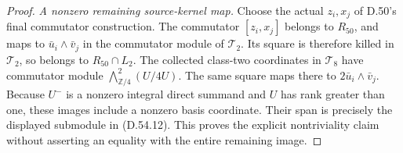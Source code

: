 \begin{proof}
\emph{A nonzero remaining source-kernel map.}
Choose the actual \(z_i,x_j\) of
D.50's final commutator construction.
The commutator \([z_i,x_j]\) belongs
to \(R_{50}\), and maps to
\(\bar u_i\wedge\bar v_j\) in the
commutator module of \(\mathcal T_2\).
Its square is therefore killed in
\(\mathcal T_2\), so belongs to
\(R_{50}\cap L_2\).
The collected class-two coordinates
in \(\mathcal T_8\) have commutator
module
\(\bigwedge^2_{\mathbb Z/4}(U/4U)\).
The same square maps there to
\(2\bar u_i\wedge\bar v_j\).
Because \(U^-\) is a nonzero integral
direct summand and \(U\) has rank
greater than one, these images
include a nonzero basis coordinate.
Their span is precisely the displayed
submodule in (D.54.12). This proves
the explicit nontriviality claim
without asserting an equality with
the entire remaining image.
\end{proof}
